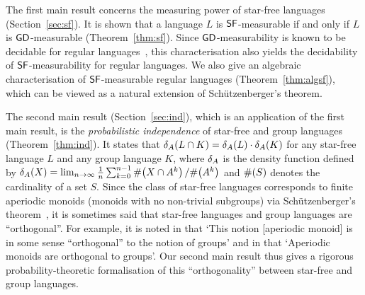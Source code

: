 The first main result concerns the measuring power of star-free languages (Section~\ref{sec:sf}).
It is shown that a language \(L\) is \(\sf\)-measurable if and only if \(L\) is \(\gd\)-measurable (Theorem~\ref{thm:sf}).
Since \(\gd\)-measurability is known to be decidable for regular languages~\cite{gdmeasure}, this characterisation also yields the decidability of \(\sf\)-measurability for regular languages.
We also give an algebraic characterisation of \(\sf\)-measurable regular languages (Theorem~\ref{thm:algsf}), which can be viewed as a natural extension of Sch\"utzenberger's theorem.

The second main result (Section~\ref{sec:ind}), which is an application of the first main result, is the \emph{probabilistic independence} of star-free and group languages (Theorem~\ref{thm:ind}).
It states that
\(\cd(L \cap K) = \cd(L) \cdot \cd(K)\) for any
star-free language \(L\) and any group language \(K\), where
\(\cd\) is the density function defined by
\(\cd(X) \defeq \lim_{n \rightarrow \infty} \frac{1}{n} \sum_{k = 0}^{n-1} \card{X \cap A^k}/\card{A^k}\) and \(\card{S}\) denotes the cardinality of a set \(S\).
Since the class of star-free languages corresponds to finite aperiodic monoids (monoids with no non-trivial subgroups) via Sch\"utzenberger's theorem~\cite{Schutzenberger1965190}, it is sometimes said that star-free languages and group languages are ``orthogonal''.
For example, it is noted in \cite{nato} that `This notion [aperiodic monoid] is in some sense ``orthogonal'' to the notion of groups' and in \cite{DAM} that `Aperiodic monoids are orthogonal to groups'. Our second main result thus gives a rigorous probability-theoretic formalisation of this ``orthogonality'' between star-free and group languages.

